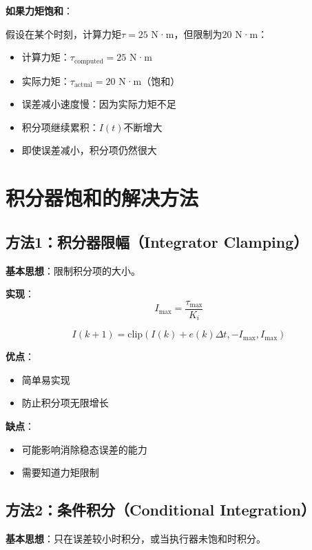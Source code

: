 \documentclass[12pt,a4paper]{article}
\begin{document}
\textbf{如果力矩饱和}：

假设在某个时刻，计算力矩$\tau = 25$ N·m，但限制为$20$ N·m：
\begin{itemize}
\item 计算力矩：$\tau_{\text{computed}} = 25$ N·m
\item 实际力矩：$\tau_{\text{actual}} = 20$ N·m（饱和）
\item 误差减小速度慢：因为实际力矩不足
\item 积分项继续累积：$I(t)$不断增大
\item 即使误差减小，积分项仍然很大
\end{itemize}

\section{积分器饱和的解决方法}

\subsection{方法1：积分器限幅（Integrator Clamping）}

\textbf{基本思想}：限制积分项的大小。

\textbf{实现}：
\begin{equation}
I_{\max} = \frac{\tau_{\max}}{K_i}
\end{equation}

\begin{equation}
I(k+1) = \text{clip}\left(I(k) + e(k) \Delta t, -I_{\max}, I_{\max}\right)
\end{equation}

\textbf{优点}：
\begin{itemize}
\item 简单易实现
\item 防止积分项无限增长
\end{itemize}

\textbf{缺点}：
\begin{itemize}
\item 可能影响消除稳态误差的能力
\item 需要知道力矩限制
\end{itemize}

\subsection{方法2：条件积分（Conditional Integration）}

\textbf{基本思想}：只在误差较小时积分，或当执行器未饱和时积分。
\end{document}
